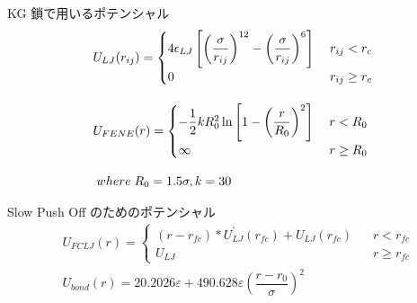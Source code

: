 \documentclass[uplatex,dvipdfmx,a4paper,11pt]{jsarticle}
\begin{document}
    \begin{center}
        \begin{minipage}{0.46\textwidth}
            \begin{itembox}[l]{KG 鎖で用いるポテンシャル}
                \scriptsize
                \begin{align*}
                    &U_{LJ}( r_{ij} ) =
                    \begin{cases}
                    4\epsilon_{LJ} \left[ \left( \dfrac{ \sigma }{ r_{ij} } \right)^{12} - \left( \dfrac{ \sigma }{ r_{ij} } \right)^{6} \right] \; & r_{ij}< r_c \\[8pt]
                    0 \; & r_{ij} \geq r_c
                    \end{cases} \\[10pt]
                    &U_{FENE}( r ) = 
                    \begin{cases}
                    -\dfrac{1}{2} k R_0^2 \ln \left[ 1 - \left( \dfrac{ r }{ R_0 } \right)^{2} \right]  \; & r < R_0 \\[8pt]
                    \infty \; & r \geq R_0
                    \end{cases} \\[8pt]
                    &\; where \; R_0 = 1.5 \sigma, k = 30 \notag
                    \end{align*}
            \end{itembox}
        \end{minipage}
        \begin{minipage}{0.5\textwidth}
            \begin{itembox}[l]{Slow Push Off のためのポテンシャル}
                \scriptsize
                \begin{align*}
                    &U_{FCLJ}(r) = 
                    \begin{cases}
                    (r-r_{fc})*U_{LJ}^{\prime}(r_{fc}) + U_{LJ}(r_{fc}) \;\;\; &r< r_{fc} \\[8pt]
                    U_{LJ}   \;\;\;\;\;\;\;\;\; &r \geq r_{fc}
                    \end{cases} \\[10pt]
                    &U_{bond}(r) = 20.2026 \varepsilon + 490.628 \varepsilon \left(\dfrac{r-r_0}{\sigma}\right)^2 \\[8pt]

\end{align*}
\end{itembox}
\end{minipage}
\end{center}
\end{document}
